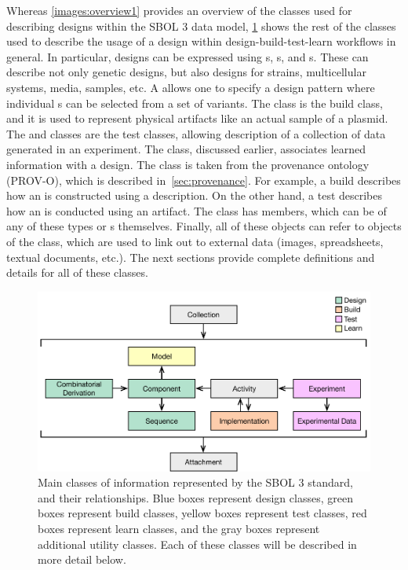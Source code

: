 Whereas \ref{images:overview1} provides an overview of the classes used for describing designs within the SBOL 3 data model,  \ref{images:overview2} shows the rest of the classes used to describe the usage of a design within design-build-test-learn workflows in general.
In particular, designs can be expressed using s, s, and s.
These can describe not only genetic designs, but also designs for strains, multicellular systems, media, samples, etc.
A  allows one to specify a design pattern where individual s can be selected from a set of variants.  
The  class is the build class, and it is used to represent physical artifacts like an actual sample of a plasmid.  
The  and  classes are the test classes, allowing description of a collection of data generated in an experiment.  
The  class, discussed earlier, associates learned information with a design.
The  class is taken from the provenance ontology (PROV-O), which is described in~\ref{sec:provenance}.  For example, a build  describes how an  is constructed using a  description.  On the other hand, a test  describes how an  is conducted using an  artifact.  The  class has members, which can be of any of these types or s themselves.  
Finally, all of these objects can refer to objects of the  class, which are used to link out to external data (images, spreadsheets, textual documents, etc.). 
The next sections provide complete definitions and details for all of these classes.

\begin{figure}[ht]
\begin{center}
\includegraphics[scale=0.85]{images/SBOL3-top-levels.pdf}
\caption{Main classes of information represented by the SBOL 3 standard, and their relationships.  Blue boxes represent design classes, green boxes represent build classes, yellow boxes represent test classes, red boxes represent learn classes, and the gray boxes represent additional utility classes.  Each of these classes will be described in more detail below.}
\label{images:overview2}
\end{center}
\end{figure}
